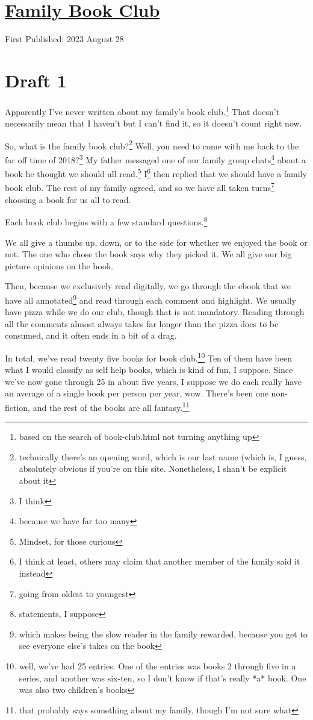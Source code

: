 \documentclass[12pt]{article}[titlepage]
\newcommand{\1}{\={a}}
\newcommand{\2}{\={e}}
\newcommand{\3}{\={\i}}
\newcommand{\4}{\=o}
\newcommand{\5}{\=u}
\newcommand{\6}{\={A}}
\renewcommand{\,}{\textsuperscript{,}}
\begin{document}
\doublespacing
\section{\href{book-club.html}{Family Book Club}}
First Published: 2023 August 28
\section{Draft 1}
Apparently I've never written about my family's book club.\footnote{based on the search of book-club.html not turning anything up}
That doesn't necessarily mean that I haven't but I can't find it, so it doesn't count right now.

So, what is the family book club?\footnote{technically there's an opening word, which is our last name (which is, I guess, absolutely obvious if you're on this site. Nonetheless, I shan't be explicit about it}
Well, you need to come with me back to the far off time of 2018?\footnote{I think}
My father messaged one of our family group chats\footnote{because we have far too many} about a book he thought we should all read.\footnote{Mindset, for those curious}
I\footnote{I think at least, others may claim that another member of the family said it instead} then replied that we should have a family book club.
The rest of my family agreed, and so we have all taken turns\footnote{going from oldest to youngest} choosing a book for us all to read.


Each book club begins with a few standard questions.\footnote{statements, I suppose}

We all give a thumbs up, down, or to the side for whether we enjoyed the book or not.
The one who chose the book says why they picked it.
We all give our big picture opinions on the book.


Then, because we exclusively read digitally, we go through the ebook that we have all annotated\footnote{which makes being the slow reader in the family rewarded, because you get to see everyone else's takes on the book} and read through each comment and highlight.
We usually have pizza while we do our club, though that is not mandatory.
Reading through all the comments almost always takes far longer than the pizza does to be consumed, and it often ends in a bit of a drag.

In total, we've read twenty five books for book club.\footnote{well, we've had 25 entries. One of the entries was books 2 through five in a series, and another was six-ten, so I don't know if that's really *a* book. One was also two children's books}
Ten of them have been what I would classify as self help books, which is kind of fun, I suppose.
Since we've now gone through 25 in about five years, I suppose we do each really have an average of a single book per person per year, wow.
There's been one non-fiction, and the rest of the books are all fantasy.\footnote{that probably says something about my family, though I'm not sure what}
\end{document}
